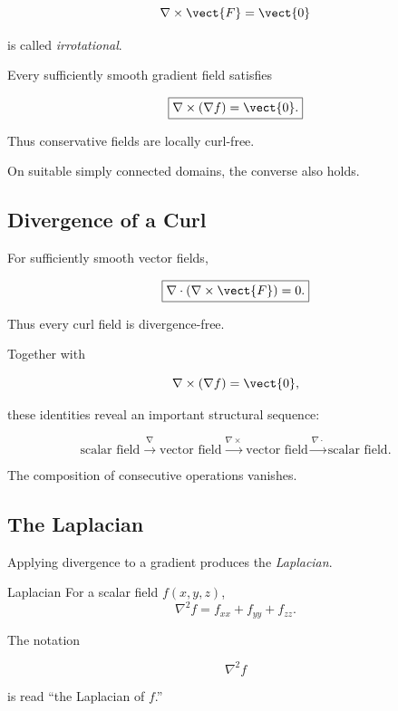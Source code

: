 \[ \nabla\times\vect{F}=\vect{0} \]

is called \emph{irrotational}.

Every sufficiently smooth gradient field satisfies

\[ \boxed{\nabla\times(\nabla f)=\vect{0}.} \]

Thus conservative fields are locally curl-free.

On suitable simply connected domains, the converse also holds.

\subsection{Divergence of a Curl}
\label{subsec:divergence-of-curl}

For sufficiently smooth vector fields,

\[ \boxed{\nabla\cdot(\nabla\times\vect{F})=0.} \]

Thus every curl field is divergence-free.

Together with

\[ \nabla\times(\nabla f)=\vect{0}, \]

these identities reveal an important structural sequence:

\[ \text{scalar field}
\xrightarrow{\nabla}
\text{vector field}
\xrightarrow{\nabla\times}
\text{vector field}
\xrightarrow{\nabla\cdot}
\text{scalar field}. \]

The composition of consecutive operations vanishes.

\subsection{The Laplacian}
\label{subsec:laplacian}

Applying divergence to a gradient produces the \emph{Laplacian}.

\begin{definitionbox}{Laplacian}
For a scalar field \(f(x,y,z)\),
\[ \boxed{
\nabla^2f
=
f_{xx}+f_{yy}+f_{zz}.
} \]
\end{definitionbox}

The notation

\[ \nabla^2f \]

is read ``the Laplacian of \(f\).''

